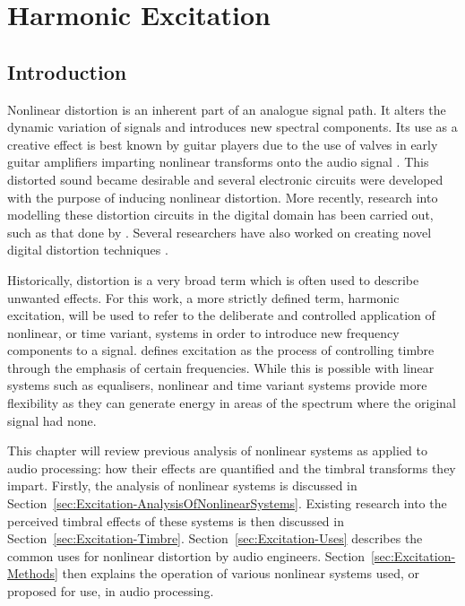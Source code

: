 \chapter{Harmonic Excitation}
\label{chap:Excitation}

\section{Introduction}
\label{sec:Excitation-Introduction}
	Nonlinear distortion is an inherent part of an analogue signal path. It alters the dynamic variation of signals and
	introduces new spectral components. Its use as a creative effect is best known by guitar players due to the use of
	valves in early guitar amplifiers imparting nonlinear transforms onto the audio signal
	\citep{dutilleux2011nonlinear}. This distorted sound became desirable and several electronic circuits were
	developed with the purpose of inducing nonlinear distortion. More recently, research into modelling these
	distortion circuits in the digital domain has been carried out, such as that done by \citet{pakarinen2009a}.
	Several researchers have also worked on creating novel digital distortion techniques
	\citep{fernandez-cid2001distortion, puckette2007patch, pekonen2008coefficient}.

	Historically, distortion is a very broad term which is often used to describe unwanted effects. For this work, a
	more strictly defined term, harmonic excitation, will be used to refer to the deliberate and controlled application
	of nonlinear, or time variant, systems in order to introduce new frequency components to a signal.
	\citet{dutilleux2011nonlinear} defines excitation as the process of controlling timbre through the emphasis of
	certain frequencies. While this is possible with linear systems such as equalisers, nonlinear and time variant
	systems provide more flexibility as they can generate energy in areas of the spectrum where the original signal had
	none.

	This chapter will review previous analysis of nonlinear systems as applied to audio processing: how their effects
	are quantified and the timbral transforms they impart. Firstly, the analysis of nonlinear systems is discussed in
	Section~\ref{sec:Excitation-AnalysisOfNonlinearSystems}. Existing research into the perceived timbral effects of
	these systems is then discussed in Section~\ref{sec:Excitation-Timbre}. Section~\ref{sec:Excitation-Uses} describes
	the common uses for nonlinear distortion by audio engineers. Section~\ref{sec:Excitation-Methods} then explains the
	operation of various nonlinear systems used, or proposed for use, in audio processing.

